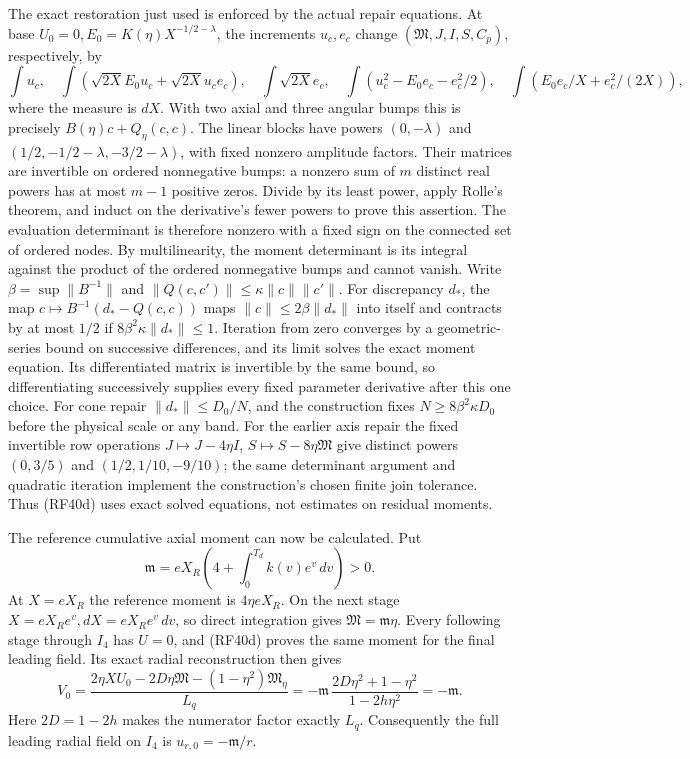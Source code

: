 \documentclass[10pt,a4paper]{article}
\begin{document}
The exact restoration just used is enforced by the actual repair
equations. At base \(U_0=0,E_0=K(\eta)X^{-1/2-\lambda}\),
the increments \(u_c,e_c\) change
\((\mathfrak M,J,I,S,C_p)\), respectively, by
\[
\int u_c,\quad
\int(\sqrt{2X}E_0u_c+\sqrt{2X}u_ce_c),\quad
\int\sqrt{2X}e_c,\quad
\int(u_c^2-E_0e_c-e_c^2/2),\quad
\int(E_0e_c/X+e_c^2/(2X)),
\tag{RF40e}
\]
where the measure is \(dX\). With two axial and three angular
bumps this is precisely \(B(\eta)c+Q_\eta(c,c)\).
The linear blocks have powers \((0,-\lambda)\) and
\((1/2,-1/2-\lambda,-3/2-\lambda)\), with fixed nonzero amplitude
factors. Their matrices are invertible on ordered nonnegative bumps:
a nonzero sum of \(m\) distinct real powers has at most \(m-1\)
positive zeros. Divide by its least power, apply Rolle's theorem,
and induct on the derivative's fewer powers to prove this assertion.
The evaluation determinant is therefore nonzero with a fixed sign on
the connected set of ordered nodes. By multilinearity, the moment
determinant is its integral against the product of the ordered
nonnegative bumps and cannot vanish.
Write \(\beta=\sup\|B^{-1}\|\) and
\(\|Q(c,c')\|\le\kappa\|c\|\|c'\|\). For discrepancy \(d_*\),
the map \(c\mapsto B^{-1}(d_*-Q(c,c))\) maps
\(\|c\|\le2\beta\|d_*\|\) into itself and contracts by at most
\(1/2\) if \(8\beta^2\kappa\|d_*\|\le1\). Iteration from zero
converges by a geometric-series bound on successive differences,
and its limit solves the exact moment equation. Its differentiated
matrix is invertible by the same bound, so differentiating successively
supplies every fixed parameter derivative after this one choice.
For cone repair \(\|d_*\|\le D_0/N\), and the construction fixes
\(N\ge8\beta^2\kappa D_0\) before the physical scale or any band.
For the earlier axis repair the fixed invertible row operations
\(J\mapsto J-4\eta I\), \(S\mapsto S-8\eta\mathfrak M\)
give distinct powers \((0,3/5)\) and
\((1/2,1/10,-9/10)\); the same determinant argument and quadratic
iteration implement the construction's chosen finite join tolerance.
Thus (RF40d) uses exact solved equations, not estimates on residual
moments.

The reference cumulative axial moment can now be calculated. Put
\[
\mathfrak m=eX_R\left(4+\int_0^{T_d}k(v)e^v\,dv\right)>0.
\tag{RF40f}
\]
At \(X=eX_R\) the reference moment is \(4\eta eX_R\).
On the next stage \(X=eX_Re^v,dX=eX_Re^v\,dv\), so direct
integration gives \(\mathfrak M=\mathfrak m\eta\). Every following
stage through \(I_4\) has \(U=0\), and (RF40d) proves the same
moment for the final leading field. Its exact radial reconstruction
then gives
\[
V_0=\frac{2\eta XU_0-2D\eta\mathfrak M-(1-\eta^2)\mathfrak M_\eta}
{L_q}
=-\mathfrak m\,\frac{2D\eta^2+1-\eta^2}{1-2h\eta^2}
=-\mathfrak m.
\tag{RF40g}
\]
Here \(2D=1-2h\) makes the numerator factor exactly \(L_q\).
Consequently the full leading radial field on \(I_4\) is
\(u_{r,0}=-\mathfrak m/r\).
\end{document}
